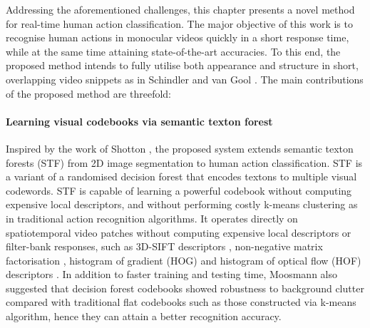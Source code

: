 Addressing the aforementioned challenges, this chapter presents a novel method for real-time human action classification. The major objective of this work is to recognise human actions in monocular videos quickly in a short response time, while at the same time attaining state-of-the-art accuracies. To this end, the proposed method intends to fully utilise both appearance and structure in short, overlapping video snippets as in Schindler and van Gool \cite{Schindler2008}. The main contributions of the proposed method are threefold:  

\paragraph{Learning visual codebooks via semantic texton forest} 
Inspired by the work of Shotton \etal \cite{Shotton2008}, the proposed system extends semantic texton forests (STF) from 2D image segmentation to human action classification. STF is a variant of a randomised decision forest \cite{Ho1995, Amit1997, Breiman2001} that encodes textons to multiple visual codewords. STF is capable of learning a powerful codebook without computing expensive local descriptors, and without performing costly k-means clustering as in traditional action recognition algorithms. It operates directly on spatiotemporal video patches without computing expensive local descriptors or filter-bank responses, such as 3D-SIFT descriptors \cite{Scovanner2007}, non-negative matrix factorisation \cite{Wong2007}, histogram of gradient (HOG) \cite{Schuldt2004, Laptev2008} and histogram of optical flow (HOF) descriptors \cite{Riemenschneider2009}. 
In addition to faster training and testing time, Moosmann \etal \cite{Moosmann2007} also suggested that decision forest codebooks showed robustness to background clutter compared with traditional flat codebooks such as those constructed via k-means algorithm, hence they can attain a better recognition accuracy.  


